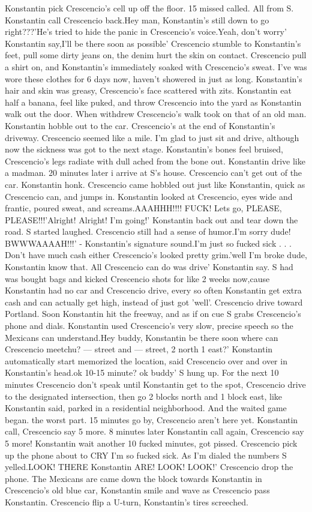 \documentclass[12pt]{book}
\begin{document}
Konstantin pick Crescencio's cell up off the floor. 15 missed called. All from S. Konstantin call Crescencio back.Hey man, Konstantin's still down to go right???'He's tried to hide the panic in Crescencio's voice.Yeah, don't worry' Konstantin say,I'll be there soon as possible' Crescencio stumble to Konstantin's feet, pull some dirty jeans on, the denim hurt the skin on contact. Crescencio pull a shirt on, and Konstantin's immediately soaked with Crescencio's sweat. I've was wore these clothes for 6 days now, haven't showered in just as long. Konstantin's hair and skin was greasy, Crescencio's face scattered with zits. Konstantin eat half a banana, feel like puked, and throw Crescencio into the yard as Konstantin walk out the door. When withdrew Crescencio's walk took on that of an old man. Konstantin hobble out to the car. Crescencio's at the end of Konstantin's driveway. Crescencio seemed like a mile. I'm glad to just sit and drive, although now the sickness was got to the next stage. Konstantin's bones feel bruised, Crescencio's legs radiate with dull ached from the bone out. Konstantin drive like a madman. 20 minutes later i arrive at S's house. Crescencio can't get out of the car. Konstantin honk. Crescencio came hobbled out just like Konstantin, quick as Crescencio can, and jumps in. Konstantin looked at Crescencio, eyes wide and frantic, poured sweat, and screams.AAAHHH!!!! FUCK! Lets go, PLEASE, PLEASE!!!'Alright! Alright! I'm going!' Konstantin back out and tear down the road. S started laughed. Crescencio still had a sense of humor.I'm sorry dude! BWWWAAAAH!!!' - Konstantin's signature sound.I'm just so fucked sick . . .  Don't have much cash either Crescencio's looked pretty grim.'well I'm broke dude, Konstantin know that. All Crescencio can do was drive' Konstantin say. S had was bought bags and kicked Crescencio shots for like 2 weeks now,cause Konstantin had no car and Crescencio drive, every so often Konstantin get extra cash and can actually get high, instead of just got 'well'. Crescencio drive toward Portland. Soon Konstantin hit the freeway, and as if on cue S grabs Crescencio's phone and dials. Konstantin used Crescencio's very slow, precise speech so the Mexicans can understand.Hey buddy, Konstantin be there soon where can Crescencio meetchu? --- street and --- street, 2 north 1 east?' Konstantin automatically start memorized the location, said Crescencio over and over in Konstantin's head.ok 10-15 minute? ok buddy' S hung up. For the next 10 minutes Crescencio don't speak until Konstantin get to the spot, Crescencio drive to the designated intersection, then go 2 blocks north and 1 block east, like Konstantin said, parked in a residential neighborhood. And the waited game began. the worst part. 15 minutes go by, Crescencio aren't here yet. Konstantin call, Crescencio say 5 more. 8 minutes later Konstantin call again, Crescencio say 5 more! Konstantin wait another 10 fucked minutes, got pissed. Crescencio pick up the phone about to CRY I'm so fucked sick. As I'm dialed the numbers S yelled.LOOK! THERE Konstantin ARE! LOOK! LOOK!' Crescencio drop the phone. The Mexicans are came down the block towards Konstantin in Crescencio's old blue car, Konstantin smile and wave as Crescencio pass Konstantin. Crescencio flip a U-turn, Konstantin's tires screeched. 
\end{document}
